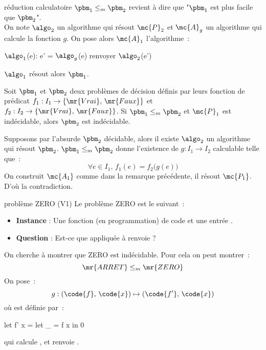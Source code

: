 \begin{adjustwidth}{-3cm}{-3cm}
\begin{remarque}{}{réduction calculatoire}
    $\pbm_1 \leq_m \pbm_2$ revient à dire que "$\pbm_1$ est plus facile que $\pbm_2$".\\
    On note $\algo_2$ un algorithme qui résout $\mc{P}_2$ et $\mc{A}_g$ un algorithme qui calcule la fonction $g$. On pose alors $\mc{A}_1$ l'algorithme~:
    \begin{lstLNat}
    $\algo_1$(e):
        e' = $\algo_g$(e)
        renvoyer $\algo_2$(e')
    \end{lstLNat}
    $\algo_1$ résout alors $\pbm_1$.
\end{remarque}

\begin{proposition}{}{}
    Soit $\pbm_1$ et $\pbm_2$ deux problèmes de décision définis par leurs fonction de prédicat $f_1 : I_1 \to \{\mr{Vrai},\, \mr{Faux}\}$ et $f_2 : I_2 \to \{\mr{Vrai},\, \mr{Faux}\}$. Si $\pbm_1 \leq_m \pbm_2$ et $\mc{P}_1$ est indécidable, alors $\pbm_2$ est indécidable.
\end{proposition}

\begin{demonstration}
    Supposons par l'absurde $\pbm_2$ décidable, alors il existe $\algo_2$ un algorithme qui résout $\pbm_2$. $\pbm_1 \leq_m \pbm_2$ donne l'existence de $g : I_1 \to I_2$ calculable telle que~:
    $$\forall e \in I_1,\, f_1(e) = f_2\Big(g(e)\Big)$$
    On construit $\mc{A_1}$ comme dans la remarque précédente, il résout $\mc{P_1}$. D'où la contradiction.
\end{demonstration}

\begin{exemple}{}{problème ZERO (V1)}
    Le problème ZERO est le suivant~:
    \begin{itemize}
        \item \textbf{Instance} : Une fonction (en programmation)  de code  et une entrée .
        \item \textbf{Question} : Est-ce que  appliquée à  renvoie  ?
    \end{itemize}
    On cherche à montrer que ZERO est indécidable. Pour cela on peut montrer~:
    $$\mr{ARRET} \leq_m \mr{ZERO}$$
    On pose~:
    $$g : (\code{f},\, \code{x}) \mapsto (\code{f'},\, \code{x})$$
    où  est définie par~:
    \begin{lstLNat}
    let f' x = let _ = f x in 0
    \end{lstLNat}
    qui calcule , et renvoie .\\\\


\end{exemple}
\end{adjustwidth}
